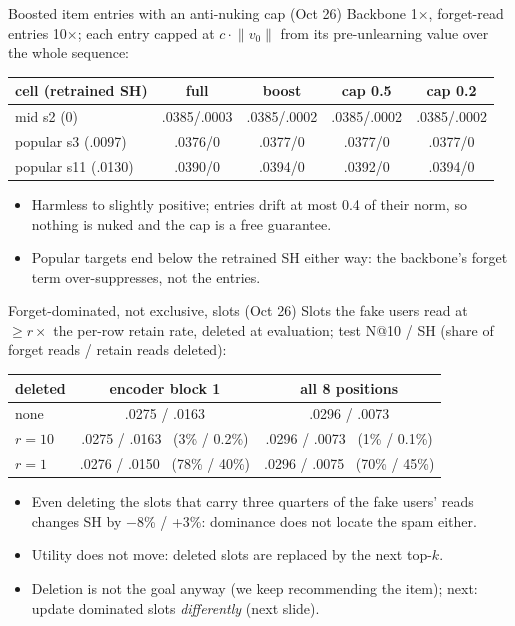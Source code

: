 \documentclass{beamer}
\begin{document}
\begin{frame}{Boosted item entries with an anti-nuking cap (Oct 26)}
Backbone 1$\times$, forget-read entries 10$\times$; each entry capped at $c \cdot
\lVert v_0 \rVert$ from its pre-unlearning value over the whole sequence:
\begin{center}
\footnotesize\setlength{\tabcolsep}{3pt}
\begin{tabular}{|l|c|c|c|c|}
\hline
cell (retrained SH) & full & boost & cap 0.5 & cap 0.2 \\
\hline
mid s2 (0)          & .0385/.0003 & .0385/.0002 & .0385/.0002 & .0385/.0002 \\
popular s3 (.0097)  & .0376/0 & .0377/0 & .0377/0 & .0377/0 \\
popular s11 (.0130) & .0390/0 & .0394/0 & .0392/0 & .0394/0 \\
\hline
\end{tabular}
\end{center}
\begin{itemize}
  \item Harmless to slightly positive; entries drift at most 0.4 of their norm,
        so nothing is nuked and the cap is a free guarantee.
  \item Popular targets end below the retrained SH either way: the backbone's
        forget term over-suppresses, not the entries.
\end{itemize}
\end{frame}

\begin{frame}{Forget-dominated, not exclusive, slots (Oct 26)}
Slots the fake users read at $\geq r\times$ the per-row retain rate, deleted at
evaluation; test N@10 / SH (share of forget reads / retain reads deleted):
\begin{center}
\footnotesize\setlength{\tabcolsep}{3pt}
\begin{tabular}{|l|c|c|}
\hline
deleted & encoder block 1 & all 8 positions \\
\hline
none & .0275 / .0163 & .0296 / .0073 \\
$r=10$ & .0275 / .0163 \ (3\% / 0.2\%) & .0296 / .0073 \ (1\% / 0.1\%) \\
$r=1$ & .0276 / .0150 \ (78\% / 40\%) & .0296 / .0075 \ (70\% / 45\%) \\
\hline
\end{tabular}
\end{center}
\begin{itemize}
  \item Even deleting the slots that carry three quarters of the fake users'
        reads changes SH by $-$8\% / +3\%: dominance does not locate the spam either.
  \item Utility does not move: deleted slots are replaced by the next top-$k$.
  \item Deletion is not the goal anyway (we keep recommending the item);
        next: update dominated slots \emph{differently} (next slide).
\end{itemize}
\end{frame}
\end{document}
